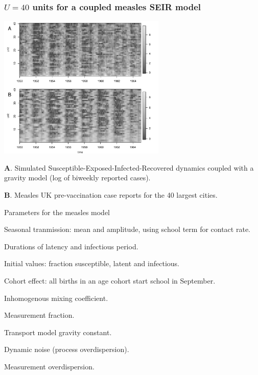 \documentclass{beamer}
\begin{document}
\begin{frame}
\frametitle{$U=40$ units for a coupled measles SEIR model}

\vspace{-2.7mm}

\begin{center}
\includegraphics[width=8cm]{slice_image_plot-1.pdf}
\end{center}

\vspace{-3mm}

{\bf A}. Simulated Susceptible-Exposed-Infected-Recovered dynamics coupled with a gravity model (log of biweekly reported cases).

{\bf B}. Measles UK pre-vaccination case reports for the 40 largest cities.





\end{frame}

\begin{frame}{Parameters for the measles model}
  \bi
\item Seasonal tranmission: mean and amplitude, using school term for contact rate.
  \item Durations of latency and infectious period.
\item Initial values: fraction susceptible, latent and infectious.
\item Cohort effect: all births in an age cohort start school in September.
\item Inhomogenous mixing coefficient.
\item Measurement fraction.
\item Transport model gravity constant.
\item Dynamic noise (process overdispersion).
\item Measurement overdispersion.

\ei

  \end{frame}
\end{document}
